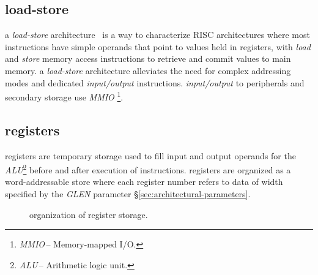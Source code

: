 \newpage
\subsection{load-store}

a \emph{load-store} architecture~\cite{radin1982ibm801} is a way to
characterize RISC architectures where most instructions have simple operands
that point to values held in registers, with \emph{load} and \emph{store}
memory access instructions to retrieve and commit values to main memory.
a \emph{load-store} architecture alleviates the need for complex addressing
modes and dedicated \emph{input/output} instructions.
\emph{input/output} to peripherals and secondary storage use \emph{MMIO}%
\footnote{\emph{MMIO}\,-- Memory-mapped I/O.}.

\subsection{registers}

registers are temporary storage used to fill input and output
operands for the \emph{ALU}\footnote{\emph{ALU}\,-- Arithmetic logic unit.}
before and after execution of instructions. registers are
organized as a word-addressable store where each register number refers
to data of width specified by the \emph{GLEN} parameter
\S\ref{sec:architectural-parameters}.
\\
\begin{figure}[H]
\centering
{}
\caption{organization of register storage.}
\label{fig:register-organization}
\end{figure}

